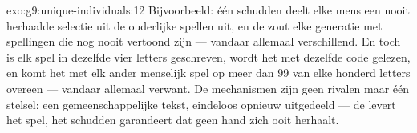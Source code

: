 \begin{solution}{exo:g9:unique-individuals:12}
Bijvoorbeeld: één schudden deelt elke mens een nooit herhaalde
selectie uit de ouderlijke spellen uit, en de  zout elke
generatie met spellingen die nog nooit vertoond zijn --- vandaar
allemaal verschillend. En toch is elk spel in dezelfde vier
letters geschreven, wordt het met dezelfde code gelezen, en komt
het met elk ander menselijk spel op meer dan $99$ van elke honderd
letters overeen --- vandaar allemaal verwant. De mechanismen zijn
geen rivalen maar één stelsel: een gemeenschappelijke tekst,
eindeloos opnieuw uitgedeeld --- de  levert het spel,
het schudden garandeert dat geen hand zich ooit herhaalt.
\end{solution}

